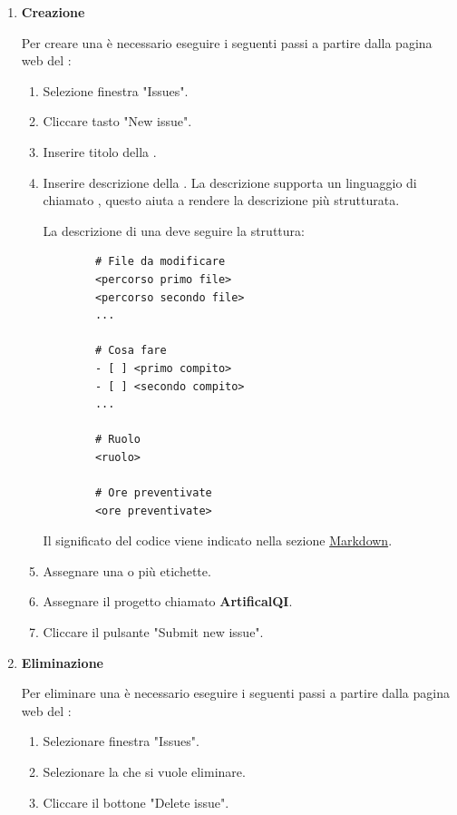 \begin{enumerate}
    \item \textbf{Creazione}
    \label{item:creazione_issue}
    
    Per creare una  è necessario eseguire i seguenti passi a partire dalla pagina web del :
    \begin{enumerate}
        \item Selezione finestra "Issues".
        \item Cliccare tasto "New issue".
        \item Inserire titolo della .
        \item Inserire descrizione della .
        La descrizione supporta un linguaggio di  chiamato , questo aiuta a rendere la descrizione più strutturata.

        La descrizione di una  deve seguire la struttura:
        \begin{lstlisting}
        # File da modificare
        <percorso primo file>
        <percorso secondo file>
        ...

        # Cosa fare
        - [ ] <primo compito>
        - [ ] <secondo compito>
        ...

        # Ruolo
        <ruolo>

        # Ore preventivate
        <ore preventivate>
        \end{lstlisting}
        Il significato del codice viene indicato nella sezione \hyperref[subpar:markdown]{Markdown}.

        \item Assegnare una o più etichette.
        \item Assegnare il progetto chiamato \textbf{ArtificalQI}.
        \item Cliccare il pulsante "Submit new issue".
    \end{enumerate}
    
    \item \textbf{Eliminazione}
    
    Per eliminare una  è necessario eseguire i seguenti passi a partire dalla pagina web del :
    \begin{enumerate}
        \item Selezionare finestra "Issues".
        \item Selezionare la  che si vuole eliminare.
        \item Cliccare il bottone "Delete issue".
    \end{enumerate}


\end{enumerate}
